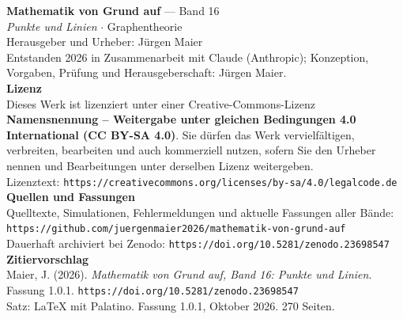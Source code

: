 \thispagestyle{empty}
\vspace*{\fill}
\begin{flushleft}
{\small\color{grau}
\textbf{\color{tief}Mathematik von Grund auf} --- Band 16\\[2pt]
\textit{Punkte und Linien} $\cdot$ Graphentheorie\\[14pt]

Herausgeber und Urheber: Jürgen Maier\\[2pt]
Entstanden 2026 in Zusammenarbeit mit Claude (Anthropic); Konzeption, Vorgaben, Prüfung und Herausgeberschaft: Jürgen Maier.\\[14pt]

\textbf{Lizenz}\\[2pt]
Dieses Werk ist lizenziert unter einer Creative-Commons-Lizenz \textbf{Namensnennung -- Weitergabe unter gleichen Bedingungen 4.0 International (CC BY-SA 4.0)}. Sie dürfen das Werk vervielfältigen, verbreiten, bearbeiten und auch kommerziell nutzen, sofern Sie den Urheber nennen und Bearbeitungen unter derselben Lizenz weitergeben.\\[2pt]
Lizenztext: \texttt{https://creativecommons.org/licenses/by-sa/4.0/legalcode.de}\\[14pt]

\textbf{Quellen und Fassungen}\\[2pt]
Quelltexte, Simulationen, Fehlermeldungen und aktuelle Fassungen aller Bände:\\
\texttt{https://github.com/juergenmaier2026/mathematik-von-grund-auf}\\[2pt]
Dauerhaft archiviert bei Zenodo: \texttt{https://doi.org/10.5281/zenodo.23698547}\\[14pt]

\textbf{Zitiervorschlag}\\[2pt]
Maier, J. (2026). \textit{Mathematik von Grund auf, Band 16: Punkte und Linien}. Fassung 1.0.1. \texttt{https://doi.org/10.5281/zenodo.23698547}\\[14pt]

Satz: \LaTeX{} mit Palatino. Fassung 1.0.1, Oktober 2026. 270 Seiten.
}
\end{flushleft}
\vspace*{1.5cm}

